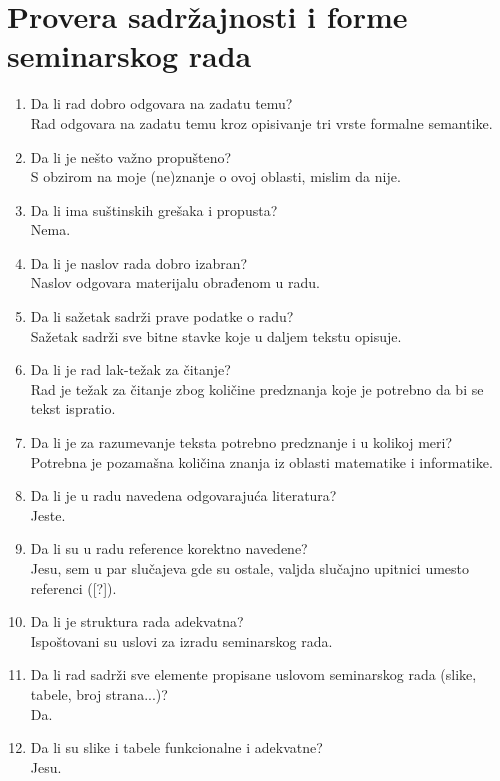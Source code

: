 \documentclass[a4paper]{report}
\begin{document}
\section{Provera sadržajnosti i forme seminarskog rada}

\begin{enumerate}
\item Da li rad dobro odgovara na zadatu temu?\\
Rad odgovara na zadatu temu kroz opisivanje tri vrste formalne semantike.
\item Da li je nešto važno propušteno?\\
S obzirom na moje (ne)znanje o ovoj oblasti, mislim da nije.
\item Da li ima suštinskih grešaka i propusta?\\
Nema.
\item Da li je naslov rada dobro izabran?\\
Naslov odgovara materijalu obrađenom u radu.
\item Da li sažetak sadrži prave podatke o radu?\\
Sažetak sadrži sve bitne stavke koje u daljem tekstu opisuje.
\item Da li je rad lak-težak za čitanje?\\
Rad je težak za čitanje zbog količine predznanja koje je potrebno da bi se tekst ispratio.
\item Da li je za razumevanje teksta potrebno predznanje i u kolikoj meri?\\
Potrebna je pozamašna količina znanja iz oblasti matematike i informatike.
\item Da li je u radu navedena odgovarajuća literatura?\\
Jeste.
\item Da li su u radu reference korektno navedene?\\
Jesu, sem u par slučajeva gde su ostale, valjda slučajno upitnici umesto referenci ([?]).
\item Da li je struktura rada adekvatna?\\
Ispoštovani su uslovi za izradu seminarskog rada.
\item Da li rad sadrži sve elemente propisane uslovom seminarskog rada (slike, tabele, broj strana...)?\\
Da.
\item Da li su slike i tabele funkcionalne i adekvatne?\\
Jesu.
\end{enumerate}
\end{document}
